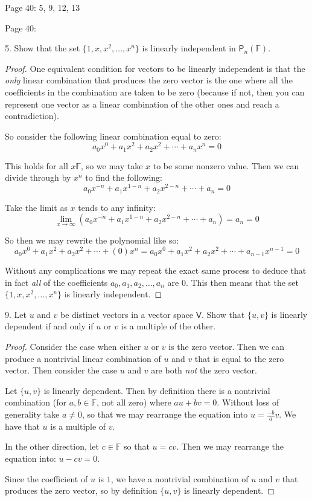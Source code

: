 \documentclass[11pt]{article}
\newcommand{\br}[1]{\left(#1\right)}
\newcommand{\cbr}[1]{\{#1\}}
\begin{document}
Page 40: 5, 9, 12, 13

Page 40:

5. Show that the set $\cbr{1,x,x^2,\dots,x^n}$ is linearly independent in $\mathsf{P}_n(\mathbb{F})$.
\begin{proof}
One equivalent condition for vectors to be linearly independent is that the \textit{only} linear combination that produces the zero vector is the one where all the coefficients in the combination are taken to be zero (because if not, then you can represent one vector as a linear combination of the other ones and reach a contradiction).

So consider the following linear combination equal to zero: 
$$a_0x^0 + a_1x^2 + a_2x^2 + \cdots + a_nx^n = 0$$

This holds for all $x\mathbb{F}$, so we may take $x$ to be some nonzero value. Then we can divide through by $x^n$ to find the following:
$$a_0x^{-n} + a_1x^{1-n} + a_2x^{2-n} + \cdots + a_n = 0$$

Take the limit as $x$ tends to any infinity:
$$\lim_{x\to\infty} \br{a_0x^{-n} + a_1x^{1-n} + a_2x^{2-n} + \cdots + a_n} = a_n = 0$$

So then we may rewrite the polynomial like so:
$$a_0x^0 + a_1x^2 + a_2x^2 + \cdots + (0)x^n = a_0x^0 + a_1x^2 + a_2x^2 + \cdots + a_{n-1}x^{n-1} = 0$$

Without any complications we may repeat the exact same process to deduce that in fact \textit{all} of the coefficients $a_0,a_1,a_2,\dots, a_n$ are $0$. This then means that the set $\cbr{1,x,x^2,\dots,x^n}$ is linearly independent.
\end{proof}

9. Let $u$ and $v$ be distinct vectors in a vector space $\mathsf{V}$. Show that $\cbr{u, v}$ is linearly dependent if and only if $u$ or $v$ is a multiple of the other.

\begin{proof}
    Consider the case when either $u$ or $v$ is the zero vector. Then we can produce a nontrivial linear combination of $u$ and $v$ that is equal to the zero vector. Then consider the case $u$ and $v$ are both \textit{not} the zero vector.

    Let $\cbr{u,v}$ is linearly dependent. Then by definition there is a nontrivial combination (for $a,b\in\mathbb{F}$, not all zero) where $au+bv = 0$. Without loss of generality take $a\neq0$, so that we may rearrange the equation into $u = \frac{-b}{a}v$. We have that $u$ is a multiple of $v$.

    In the other direction, let $c\in\mathbb{F}$ so that $u = cv$. Then we may rearrange the equation into: $u-cv = 0$. 
    
    Since the coefficient of $u$ is $1$, we have a nontrivial combination of $u$ and $v$ that produces the zero vector, so by definition $\cbr{u,v}$ is linearly dependent.
\end{proof}
\end{document}
